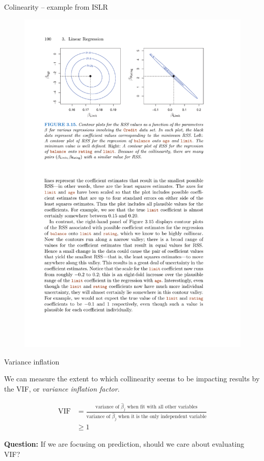 \documentclass[aspectratio=169]{beamer}
\begin{document}
\begin{frame}{Colinearity -- example from ISLR}

\begin{figure}
\includegraphics[height=0.8\textheight]{ISLR_fig3_15}
\caption*{}
\end{figure}

\end{frame}


\begin{frame}{Variance inflation}

We can measure the extent to which collinearity seems to be impacting results by the VIF, or \textit{variance inflation factor}.

\begin{align*}
\text{VIF} &= \frac{\text{variance of $\hat{\beta}_j$ when fit with all other variables}}{\text{variance of $\hat{\beta}_j$ when it is the only independent variable}}\\
&\geq 1
\end{align*}

\textbf{Question:} If we are focusing on prediction, should we care about evaluating VIF?


\end{frame}
\end{document}
